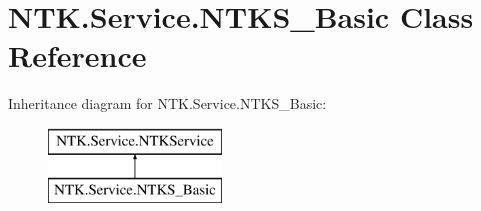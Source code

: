 \hypertarget{class_n_t_k_1_1_service_1_1_n_t_k_s___basic}{}\section{N\+T\+K.\+Service.\+N\+T\+K\+S\+\_\+\+Basic Class Reference}
\label{class_n_t_k_1_1_service_1_1_n_t_k_s___basic}


 


Inheritance diagram for N\+T\+K.\+Service.\+N\+T\+K\+S\+\_\+\+Basic\+:\begin{figure}[H]
\begin{center}
\leavevmode
\includegraphics[height=2.000000cm]{d1/d9f/class_n_t_k_1_1_service_1_1_n_t_k_s___basic}
\end{center}
\end{figure}
